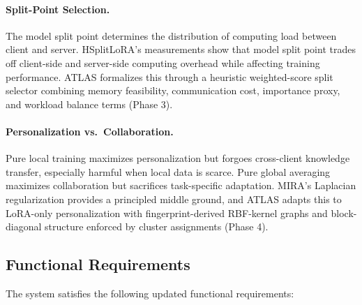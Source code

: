 \documentclass[11pt,a4paper]{article}
\begin{document}
\paragraph{Split-Point Selection.}
The model split point determines the distribution of computing load between client and server. HSplitLoRA's measurements show that model split point trades off client-side and server-side computing overhead while affecting training performance. ATLAS formalizes this through a heuristic weighted-score split selector combining memory feasibility, communication cost, importance proxy, and workload balance terms (Phase 3).

\paragraph{Personalization vs.\ Collaboration.}
Pure local training maximizes personalization but forgoes cross-client knowledge transfer, especially harmful when local data is scarce. Pure global averaging maximizes collaboration but sacrifices task-specific adaptation. MIRA's Laplacian regularization provides a principled middle ground, and ATLAS adapts this to LoRA-only personalization with fingerprint-derived RBF-kernel graphs and block-diagonal structure enforced by cluster assignments (Phase 4).

\subsection{Functional Requirements}

The system satisfies the following updated functional requirements:
\end{document}

